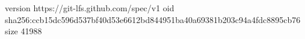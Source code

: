 version https://git-lfs.github.com/spec/v1
oid sha256:ccb15dc596d537bf40d53e6612bd844951ba40a69381b203c94a4fdc8895cb76
size 41988
